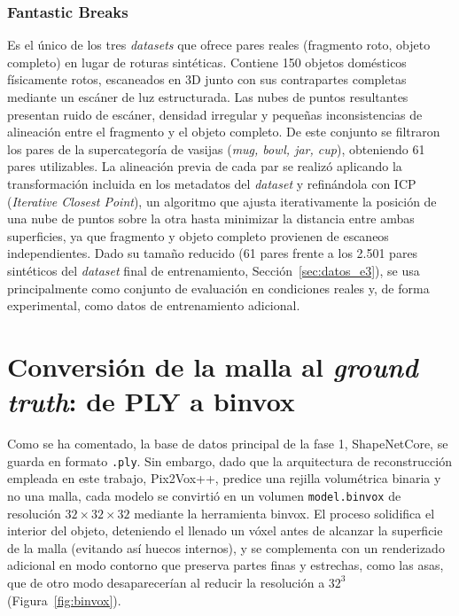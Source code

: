 \documentclass[10pt,a4paper]{report}
\begin{document}
\subsubsection*{Fantastic Breaks \textnormal{\citep{lamb2023fantastic}}}
Es el único de los tres \textit{datasets} que ofrece pares reales (fragmento roto,
objeto completo) en lugar de roturas sintéticas.
Contiene 150 objetos domésticos físicamente rotos, escaneados en 3D junto con sus
contrapartes completas mediante un escáner de luz estructurada.
Las nubes de puntos resultantes presentan ruido de escáner, densidad irregular y pequeñas
inconsistencias de alineación entre el fragmento y el objeto completo.
De este conjunto se filtraron los pares de la supercategoría de vasijas (\textit{mug,
bowl, jar, cup}), obteniendo 61 pares utilizables.
La alineación previa de cada par se realizó aplicando la transformación incluida en los
metadatos del \textit{dataset} y refinándola con ICP (\textit{Iterative Closest Point}),
un algoritmo que ajusta iterativamente la posición de una nube de puntos sobre la otra
hasta minimizar la distancia entre ambas superficies, ya que fragmento y objeto completo
provienen de escaneos independientes.
Dado su tamaño reducido (61 pares frente a los 2.501 pares sintéticos del \textit{dataset}
final de entrenamiento, Sección~\ref{sec:datos_e3}), se usa principalmente como conjunto
de evaluación en condiciones reales y, de forma experimental, como datos de entrenamiento adicional.

\section{Conversión de la malla al \textit{ground truth}: de PLY a binvox}
\label{sec:ply_binvox}

Como se ha comentado, la base de datos principal de la fase 1, ShapeNetCore,
se guarda en formato \texttt{.ply}. Sin embargo, dado que la arquitectura de
reconstrucción empleada en este trabajo, Pix2Vox++, predice una rejilla
volumétrica binaria y no una malla, cada modelo se convirtió en un volumen
\texttt{model.binvox} de resolución $32\times32\times32$ mediante la herramienta
binvox. El proceso solidifica el interior del objeto,
deteniendo el llenado un vóxel antes de alcanzar la superficie de la malla
(evitando así huecos internos), y se complementa con un renderizado adicional
en modo contorno que preserva partes finas y estrechas, como las asas, que de
otro modo desaparecerían al reducir la resolución a $32^3$
(Figura~\ref{fig:binvox}).
\end{document}
